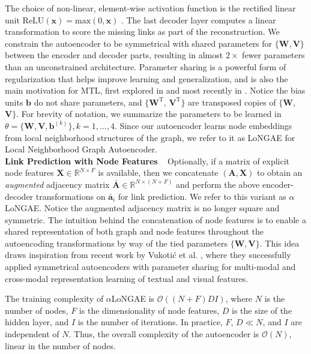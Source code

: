\documentclass[letterpaper, conference]{IEEEtran}
\begin{document}
The choice of non-linear, element-wise activation function is the rectified linear unit $\text{ReLU}(\mathbf{x}) = \text{max}(0, \mathbf{x})$ \cite{Nair:2010}. The last decoder layer computes a linear transformation to score the missing links as part of the reconstruction. We constrain the autoencoder to be symmetrical with shared parameters for $\{\mathbf{W},\mathbf{V}\}$ between the encoder and decoder parts, resulting in almost $2\times$ fewer parameters than an unconstrained architecture. Parameter sharing is a powerful form of regularization that helps improve learning and generalization, and is also the main motivation for MTL, first explored in \cite{Caruana:1993} and most recently in \cite{Yang:2017}. Notice the bias units $\mathbf{b}$ do not share parameters, and $\big\{\mathbf{W}^\text{T}$, $\mathbf{V}^\text{T}\big\}$ are transposed copies of $\{\mathbf{W}$, $\mathbf{V}\}$. For brevity of notation, we summarize the parameters to be learned in $\theta = \big\{\mathbf{W}, \mathbf{V}, \mathbf{b}^{(k)}\big\}, k=1,...,4$. Since our autoencoder learns node embeddings from local neighborhood structures of the graph, we refer to it as LoNGAE for Local Neighborhood Graph Autoencoder.\\

\noindent \textbf{Link Prediction with Node Features} ~ Optionally, if a matrix of explicit node features $\mathbf{X} \in \mathbb{R}^{N \times F}$ is available, then we concatenate $(\mathbf{A},\mathbf{X})$ to obtain an \emph{augmented} adjacency matrix $\mathbf{\bar{A}} \in \mathbb{R}^{N \times (N + F)}$ and perform the above encoder-decoder transformations on $\mathbf{\bar{a}}_i$ for link prediction. We refer to this variant as $\alpha$LoNGAE. Notice the augmented adjacency matrix is no longer square and symmetric. The intuition behind the concatenation of node features is to enable a shared representation of both graph and node features throughout the autoencoding transformations by way of the tied parameters $\{\mathbf{W},\mathbf{V}\}$. This idea draws inspiration from recent work by Vukoti{\'c} et al. \cite{Vukotic:2016}, where they successfully applied symmetrical autoencoders with parameter sharing for multi-modal and cross-modal representation learning of textual and visual features.

The training complexity of $\alpha$LoNGAE is $\mathcal{O}((N+F)DI)$, where $N$ is the number of nodes, $F$ is the dimensionality of node features, $D$ is the size of the hidden layer, and $I$ is the number of iterations. In practice, $F$, $D \ll N$, and $I$ are independent of $N$. Thus, the overall complexity of the autoencoder is $\mathcal{O}(N)$, linear in the number of nodes.\\
\end{document}
